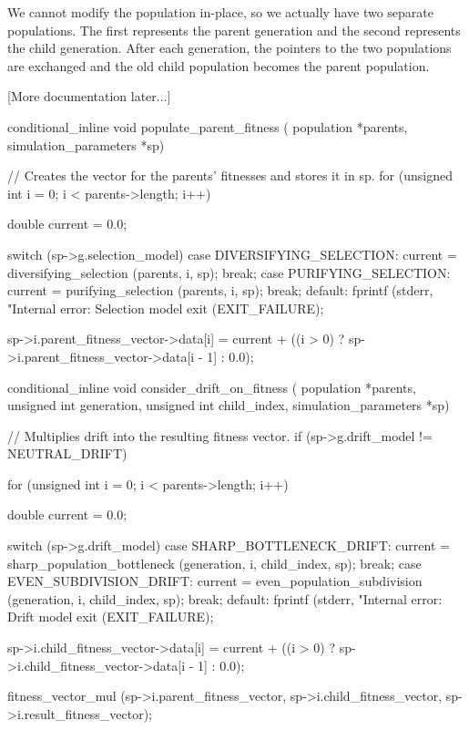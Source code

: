 \documentclass{article}
\begin{document}
      We cannot modify the population in-place, so we actually have two separate
      populations. The first represents the parent generation and the second
      represents the child generation. After each generation, the pointers to
      the two populations are exchanged and the old child population becomes the
      parent population.

      [More documentation later...]

\begin{ccode}
conditional_inline void populate_parent_fitness (
			  population *parents, simulation_parameters *sp) {
  // Creates the vector for the parents' fitnesses and stores it in sp.
  for (unsigned int i = 0; i < parents->length; i++) {
    double current = 0.0;

    switch (sp->g.selection_model) {
      case DIVERSIFYING_SELECTION:
	current = diversifying_selection (parents, i, sp);
	break;
      case PURIFYING_SELECTION:
	current = purifying_selection (parents, i, sp);
	break;
      default:
	fprintf (stderr, "Internal error: Selection model %
	exit (EXIT_FAILURE);
    }

    sp->i.parent_fitness_vector->data[i] = current +
      ((i > 0) ? sp->i.parent_fitness_vector->data[i - 1] : 0.0);
  }
}

conditional_inline void consider_drift_on_fitness (
			  population *parents, unsigned int generation,
			  unsigned int child_index, simulation_parameters *sp) {
  // Multiplies drift into the resulting fitness vector.
  if (sp->g.drift_model != NEUTRAL_DRIFT) {
    for (unsigned int i = 0; i < parents->length; i++) {
      double current = 0.0;

      switch (sp->g.drift_model) {
        case SHARP_BOTTLENECK_DRIFT:
	  current = sharp_population_bottleneck (generation, i, child_index, sp);
	  break;
        case EVEN_SUBDIVISION_DRIFT:
	  current = even_population_subdivision (generation, i, child_index, sp);
	  break;
        default:
	  fprintf (stderr, "Internal error: Drift model %
	  exit (EXIT_FAILURE);
      }

      sp->i.child_fitness_vector->data[i] = current +
        ((i > 0) ? sp->i.child_fitness_vector->data[i - 1] : 0.0);
    }

    fitness_vector_mul (sp->i.parent_fitness_vector, sp->i.child_fitness_vector,
			sp->i.result_fitness_vector);
  }
}


\end{ccode}
\end{document}
